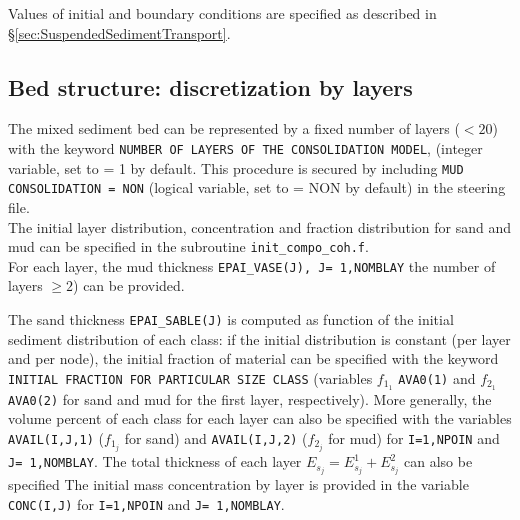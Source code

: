 Values of initial and boundary conditions are specified as described in \S\ref{sec:SuspendedSedimentTransport}.

\subsection{Bed structure: discretization by layers}
The mixed sediment bed can be represented by a fixed number of layers ($<20$) with the keyword \texttt{NUMBER OF LAYERS OF THE CONSOLIDATION MODEL}, (integer variable, set to {\ttfamily = 1} by default. This procedure is secured by including \texttt{MUD CONSOLIDATION = NON} (logical variable, set to {\ttfamily = NON} by default) in the steering file.\\

The initial layer distribution, concentration and fraction distribution for sand and mud can be specified in the subroutine \texttt{init\_compo\_coh.f}.\\

For each layer, the mud thickness \texttt{EPAI\_VASE(J), J= 1,NOMBLAY} the number of layers $\geq 2$) can be provided.

The sand thickness \texttt{EPAI\_SABLE(J)} is computed as function of the initial sediment distribution of each class: if the initial distribution is constant (per layer and per node), the initial fraction of material can be specified with the keyword \texttt{INITIAL FRACTION FOR PARTICULAR SIZE CLASS} (variables $f_{1_1}$ \texttt{AVA0(1)} and $f_{2_1}$ \texttt{AVA0(2)} for sand and mud for the first layer, respectively).
More generally, the volume percent of each class for each layer can also be specified with the variables \texttt{AVAIL(I,J,1)} ($f_{1_j}$ for sand) and \texttt{AVAIL(I,J,2)} ($f_{2_j}$ for mud) for \texttt{I=1,NPOIN} and \texttt{J= 1,NOMBLAY}. The total thickness of each layer $E_{s_j} = E_{s_j}^1 + E_{s_j}^2$ can also be specified 
The initial mass concentration by layer is provided in the variable \texttt{CONC(I,J)} for \texttt{I=1,NPOIN} and \texttt{J= 1,NOMBLAY}.


